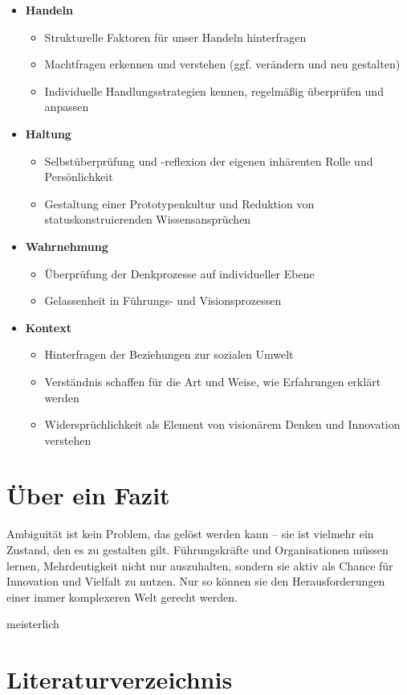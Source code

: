 \documentclass[
  ngerman,
  letterpaper,
  DIV=11]{scrartcl}
\providecommand{\tightlist}{%
  \setlength{\itemsep}{0pt}\setlength{\parskip}{0pt}}
\begin{document}
\begin{itemize}
\tightlist
\item
  \textbf{Handeln}

  \begin{itemize}
  \tightlist
  \item
    Strukturelle Faktoren für unser Handeln hinterfragen
  \item
    Machtfragen erkennen und verstehen (ggf. verändern und neu
    gestalten)
  \item
    Individuelle Handlungsstrategien kennen, regelmäßig überprüfen und
    anpassen
  \end{itemize}
\item
  \textbf{Haltung}

  \begin{itemize}
  \tightlist
  \item
    Selbstüberprüfung und -reflexion der eigenen inhärenten Rolle und
    Persönlichkeit
  \item
    Gestaltung einer Prototypenkultur und Reduktion von
    statuskonstruierenden Wissensansprüchen
  \end{itemize}
\item
  \textbf{Wahrnehmung}

  \begin{itemize}
  \tightlist
  \item
    Überprüfung der Denkprozesse auf individueller Ebene
  \item
    Gelassenheit in Führungs- und Visionsprozessen
  \end{itemize}
\item
  \textbf{Kontext}

  \begin{itemize}
  \tightlist
  \item
    Hinterfragen der Beziehungen zur sozialen Umwelt
  \item
    Verständnis schaffen für die Art und Weise, wie Erfahrungen erklärt
    werden
  \item
    Widersprüchlichkeit als Element von visionärem Denken und Innovation
    verstehen
  \end{itemize}
\end{itemize}

\section{Über ein Fazit}\label{uxfcber-ein-fazit}

Ambiguität ist kein Problem, das gelöst werden kann -- sie ist vielmehr
ein Zustand, den es zu gestalten gilt. Führungskräfte und Organisationen
müssen lernen, Mehrdeutigkeit nicht nur auszuhalten, sondern sie aktiv
als Chance für Innovation und Vielfalt zu nutzen. Nur so können sie den
Herausforderungen einer immer komplexeren Welt gerecht werden.

meisterlich

\section{Literaturverzeichnis}\label{literaturverzeichnis}

\printbibliography[heading=none]
\end{document}
